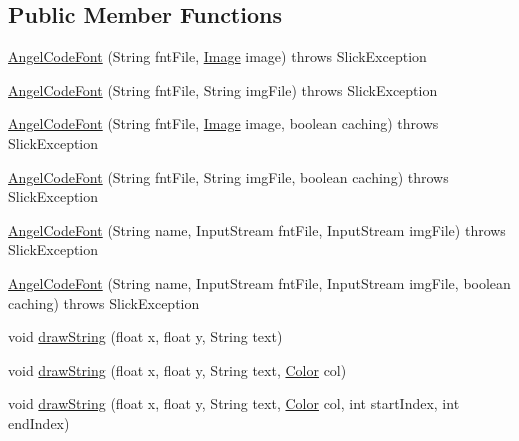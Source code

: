 \subsection*{Public Member Functions}
\begin{DoxyCompactItemize}
\item 
\mbox{\hyperlink{classorg_1_1newdawn_1_1slick_1_1_angel_code_font_ace951b7ad8fa5c241e0abc04b753a19d}{Angel\+Code\+Font}} (String fnt\+File, \mbox{\hyperlink{classorg_1_1newdawn_1_1slick_1_1_image}{Image}} image)  throws Slick\+Exception 
\item 
\mbox{\hyperlink{classorg_1_1newdawn_1_1slick_1_1_angel_code_font_a297faf1a0114300995431cb785de84a7}{Angel\+Code\+Font}} (String fnt\+File, String img\+File)  throws Slick\+Exception 
\item 
\mbox{\hyperlink{classorg_1_1newdawn_1_1slick_1_1_angel_code_font_a99a224bebb26190c9a63dc137e244c2d}{Angel\+Code\+Font}} (String fnt\+File, \mbox{\hyperlink{classorg_1_1newdawn_1_1slick_1_1_image}{Image}} image, boolean caching)  throws Slick\+Exception 
\item 
\mbox{\hyperlink{classorg_1_1newdawn_1_1slick_1_1_angel_code_font_a2411ec47cc2aae89de84eb458965f23a}{Angel\+Code\+Font}} (String fnt\+File, String img\+File, boolean caching)  throws Slick\+Exception 
\item 
\mbox{\hyperlink{classorg_1_1newdawn_1_1slick_1_1_angel_code_font_a42a4781ac6490b35dfd4aa2ab198bf63}{Angel\+Code\+Font}} (String name, Input\+Stream fnt\+File, Input\+Stream img\+File)  throws Slick\+Exception 
\item 
\mbox{\hyperlink{classorg_1_1newdawn_1_1slick_1_1_angel_code_font_a6c9903125d8255e1039635a9b13a7786}{Angel\+Code\+Font}} (String name, Input\+Stream fnt\+File, Input\+Stream img\+File, boolean caching)  throws Slick\+Exception 
\item 
void \mbox{\hyperlink{classorg_1_1newdawn_1_1slick_1_1_angel_code_font_a8cc06c81dd2f11c47844d863a03e3433}{draw\+String}} (float x, float y, String text)
\item 
void \mbox{\hyperlink{classorg_1_1newdawn_1_1slick_1_1_angel_code_font_a8067ec0d8027311bbcc16aaec1421b2d}{draw\+String}} (float x, float y, String text, \mbox{\hyperlink{classorg_1_1newdawn_1_1slick_1_1_color}{Color}} col)
\item 
void \mbox{\hyperlink{classorg_1_1newdawn_1_1slick_1_1_angel_code_font_abed0e6374eb587d6a49f3f33e69f34c0}{draw\+String}} (float x, float y, String text, \mbox{\hyperlink{classorg_1_1newdawn_1_1slick_1_1_color}{Color}} col, int start\+Index, int end\+Index)

\end{DoxyCompactItemize}
